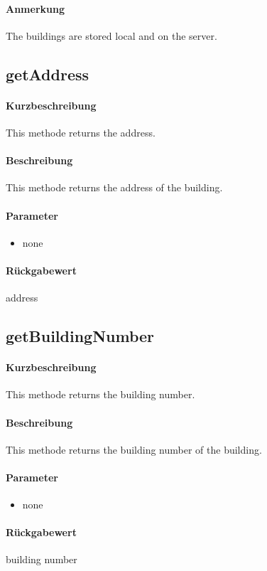 \paragraph*{Anmerkung}
The buildings are stored local and on the server.

\subsection{getAddress}%
\paragraph*{Kurzbeschreibung}
This methode returns the address.
\paragraph*{Beschreibung}
This methode returns the address of the building.
\paragraph*{Parameter}
\begin{itemize}
    \item none
\end{itemize}
\paragraph*{Rückgabewert}
address

\subsection{getBuildingNumber}%
\paragraph*{Kurzbeschreibung}
This methode returns the building number.
\paragraph*{Beschreibung}
This methode returns the building number of the building.
\paragraph*{Parameter}
\begin{itemize}
    \item none
\end{itemize}
\paragraph*{Rückgabewert}
building number

